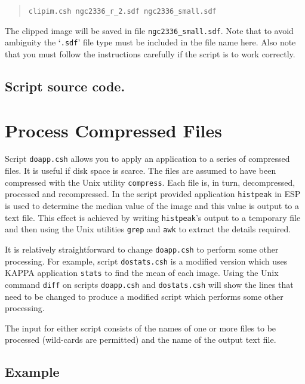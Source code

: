 \documentclass[twoside,11pt]{article}
\newcommand{\htmladdnormallink}[2]{#1}
\newcommand{\xref}[3]{#1}
\newcommand{\xlabel}[1]{}
\begin{document}
\begin{quote}
{\tt clipim.csh ngc2336\_r\_2.sdf ngc2336\_small.sdf}
\end{quote}

The clipped image will be saved in file {\tt ngc2336\_small.sdf}.  Note
that to avoid ambiguity the `{\tt .sdf}' file type must be included in
the file name here.  Also note that you must follow the instructions
carefully if the script is to work correctly.

\begin{htmlonly}
\subsection*{\htmladdnormallink{Script source code.}{clipim.lis}}
\end{htmlonly}


\newpage
\section{\xlabel{DOAPP}\label{DOAPP}Process Compressed Files}

Script {\tt doapp.csh} allows you to apply an application to a series
of compressed files.  It is useful if disk space is scarce.  The files
are assumed to have been compressed with the Unix utility {\tt compress}.
Each file is, in turn, decompressed, processed and recompressed.  In the
script provided application \xref{{\tt histpeak}}{sun180}{SESSION1} in 
\xref{ESP}{sun180}{} is used to determine the median value of the image and
this value is output to a text file.  This effect is achieved by writing
{\tt histpeak}'s output to a temporary file and then using the Unix
utilities {\tt grep} and {\tt awk} to extract the details required.

It is relatively straightforward to change {\tt doapp.csh} to perform
some other processing.  For example, script {\tt dostats.csh} is a
modified version which uses \xref{KAPPA}{sun95}{} application
\xref{{\tt stats}}{sun95}{STATS} to find the mean of each image.
Using the Unix command {\tt diff} on scripts {\tt doapp.csh} and
{\tt dostats.csh} will show the lines that need to be changed to
produce a modified script which performs some other processing.

The input for either script consists of the names of one or more files to
be processed (wild-cards are permitted) and the name of the output text
file.

\subsection*{Example}
\end{document}
